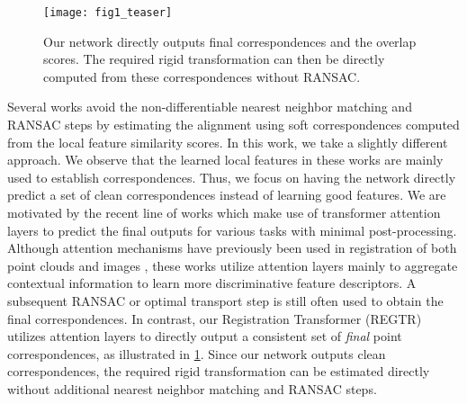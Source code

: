 \documentclass[10pt,twocolumn,letterpaper]{article}
\begin{document}
\begin{figure}[t]
    \centering
    \texttt{[image: fig1\_teaser]}
    \vspace{-3mm}
    \caption{Our network directly outputs final correspondences and the overlap scores. The required rigid transformation can then be directly computed from these correspondences without RANSAC.} \vspace{-5mm}
    \label{fig:teaser}
\end{figure}

Several works \cite{wang2019dcp,yew2020rpmnet,wang2019prnet} avoid the non-differentiable nearest neighbor matching and RANSAC steps by estimating the alignment using soft correspondences computed from the local feature similarity scores. In this work, we take a slightly different approach. 
We observe that the learned local features in these works are mainly used to establish correspondences.
Thus, we focus on having the network directly predict a set of clean correspondences instead of learning good features.
We are motivated by the recent line of works \cite{carion2020detr,misra2021-3detr} which make use of transformer attention \cite{vaswani2017attention} layers to predict the final outputs for various tasks with minimal post-processing. Although attention mechanisms have previously been used in registration of both point clouds \cite{wang2019dcp,huang2021predator} and images \cite{sarlin2020superglue}, these works utilize attention layers mainly to aggregate contextual information to learn more discriminative feature descriptors. A subsequent RANSAC or optimal transport step is still often used to obtain the final correspondences.
In contrast, our Registration Transformer (REGTR) utilizes attention layers to directly output a consistent set of \emph{final} point correspondences, as illustrated in \cref{fig:teaser}. Since our network outputs clean correspondences, the required rigid transformation can be estimated directly without additional nearest neighbor matching and RANSAC steps.
\end{document}
